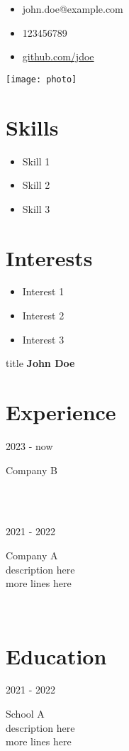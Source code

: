 \documentclass[12pt]{article}
\makeatletter
\newcommand{\signature}{
  \begin{flushright}
    {\huge title \textbf{John Doe}}
  \end{flushright}
}
\newcommand{\photo}{
  \begin{center}
    \texttt{[image: photo]}
  \end{center}
}
\newcommand{\summary}{
  \section*{}
  \blindtext
}
\newcommand{\contactinfo}{
  \begin{itemize}
    \item[{\faEnvelope[regular]}] john.doe@example.com
    \item[{\faPhone*}] 123456789
    \item[{\faGithub}] \href{https://github.com/jdoe}{github.com/jdoe}
  \end{itemize}
}
\newcommand\historyentry[3]{
  \parbox[b]{70pt}{#1}
  \color{teal}
  \makebox[0pt][c]{$\bullet$}\vrule\quad
  \color{black}
  \parbox[t]{255pt}{\Large #2\\\normalsize #3\\[5pt]}\\[-3pt]
}
\newcommand{\experience}{
  \section*{{\faSuitcase} Experience}
  \historyentry{2023 - now}{Company B}{\blindtext}
  \historyentry{2021 - 2022}{Company A}{description here\\more lines here}
}
\newcommand{\education}{
  \section*{{\faGraduationCap} Education}
  \historyentry{2021 - 2022}{School A}{description here\\more lines here}
}
\newcommand{\skills}{
  \section*{{\faBrain} Skills}
  \begin{itemize}
    \item Skill 1
    \item Skill 2
    \item Skill 3
  \end{itemize}
}
\newcommand{\interests}{
  \section*{{\faBook} Interests}
  \begin{itemize}
    \item Interest 1
    \item Interest 2
    \item Interest 3
  \end{itemize}
}
\makeatother
\begin{document}
\begin{paracol}{2}
  \begin{leftcolumn}
    \contactinfo
    \photo
    \skills
    \interests
  \end{leftcolumn}
  \begin{rightcolumn}
    \signature
    \summary
    \experience
    \education
  \end{rightcolumn}
\end{paracol}
\end{document}
